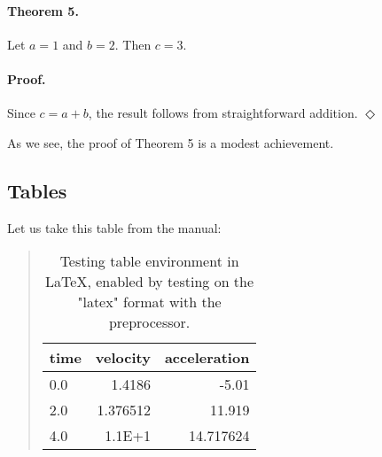 \documentclass[%
oneside,                 %
final,                   %
10pt]{article}
\theoremstyle{definition}
\begin{document}
\begin{enumerate}
\label{theorem:fundamental1}

\paragraph{Theorem 5.}
Let $a=1$ and $b=2$. Then $c=3$.

\paragraph{Proof.}
Since $c=a+b$, the result follows from straightforward addition.
$\Diamond$

As we see, the proof of Theorem 5 is a modest
achievement.

\subsection{Tables}
\label{subsec:table}



Let us take this table from the manual:

\begin{table}
\caption{
Testing table environment in {\LaTeX}, enabled by testing on the "latex" format
with the preprocessor.
\label{mytab}
}


\begin{quote}
\begin{tabular}{lrr}
\hline
\multicolumn{1}{c}{ time } & \multicolumn{1}{c}{ velocity } & \multicolumn{1}{c}{ acceleration } \\
\hline
0.0  & 1.4186   & -5.01        \\
2.0  & 1.376512 & 11.919       \\
4.0  & 1.1E+1   & 14.717624    \\
\hline
\end{tabular}
\end{quote}

\noindent
\end{table}


\end{enumerate}
\end{document}
